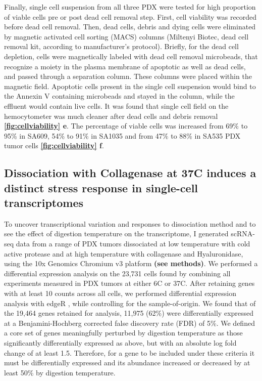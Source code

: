 Finally, single cell suspension from all three PDX were tested for high proportion of viable cells pre or post dead cell removal step. First, cell viability was recorded before dead cell removal. Then, dead cells, debris and dying cells were eliminated by magnetic activated cell sorting (MACS) columns (Miltenyi Biotec, dead cell removal kit, according to manufacturer's protocol). Briefly, for the dead cell
depletion, cells were magnetically labeled with dead cell removal
microbeads, that recognize a moiety in the plasma
membrane of apoptotic as well as dead cells, and passed through a separation column. These columns were placed within the magnetic field. Apoptotic cells present in the single cell suspension would bind to the Annexin V containing microbeads and stayed in the column, while the effluent would contain live cells. It was found that single cell field on the hemocytometer was much cleaner after dead cells and debris removal \textbf{\autoref{fig:cellviability} e}.
The percentage of viable cells was increased from 69\% to 95\% in SA609, 54\% to 91\% in SA1035 and from 47\% to 88\% in SA535 PDX tumor cells \textbf{\autoref{fig:cellviability} f}. 







\subsection{Dissociation with Collagenase at 37\textdegree C induces a distinct stress response in single-cell transcriptomes}
To uncover transcriptional variation and responses to dissociation method and to see the effect of digestion temperature on the transcriptome, I generated scRNA-seq data from a range of PDX tumors dissociated at low temperature with cold active protease and at high temperature with collagenase and Hyaluronidase, using the 10x Genomics Chromium v3 platform \textbf{(see methods)}.
We performed a differential expression analysis on the 23,731 cells found by combining all experiments measured in PDX tumors at either 6\textdegree C or 37\textdegree C. After retaining genes with at least 10 counts across all cells, we performed differential expression analysis with edgeR \cite{robinson2010edger}, while controlling for the sample-of-origin.
We found that of the 19,464 genes retained for analysis, 11,975 (62\%) were differentially expressed at a Benjamini-Hochberg corrected false discovery rate (FDR) of 5\%. We defined a core set of genes meaningfully perturbed by digestion temperature as those significantly differentially expressed as above, but with an absolute log fold change of at least 1.5. Therefore, for a gene to be included under these criteria it must be differentially expressed and its abundance increased or decreased by at least 50\% by digestion temperature. 

